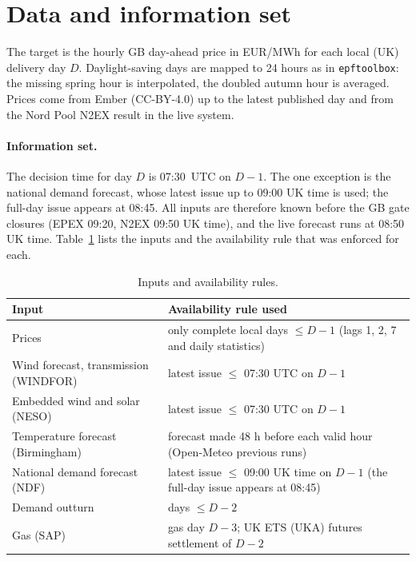 \documentclass[11pt,a4paper]{article}
\begin{document}
\section{Data and information set}
\label{sec:data}

The target is the hourly GB day-ahead price in EUR/MWh for each local (UK) delivery day $D$. Daylight-saving days are mapped to 24 hours as in \texttt{epftoolbox}: the missing spring hour is interpolated, the doubled autumn hour is averaged. Prices come from Ember (CC-BY-4.0) up to the latest published day and from the Nord Pool N2EX result in the live system.

\paragraph{Information set.} The decision time for day $D$ is 07:30~UTC on $D\!-\!1$. The one exception is the national demand forecast, whose latest issue up to 09:00 UK time is used; the full-day issue appears at 08:45. All inputs are therefore known before the GB gate closures (EPEX 09:20, N2EX 09:50 UK time), and the live forecast runs at 08:50 UK time. Table~\ref{tab:inputs} lists the inputs and the availability rule that was enforced for each.

\begin{table}[ht]
\centering\small
\begin{tabular}{p{4.6cm}p{9.6cm}}
\toprule
Input & Availability rule used\\
\midrule
Prices & only complete local days $\le D\!-\!1$ (lags 1, 2, 7 and daily statistics)\\
Wind forecast, transmission (WINDFOR) & latest issue $\le$ 07:30 UTC on $D\!-\!1$\\
Embedded wind and solar (NESO) & latest issue $\le$ 07:30 UTC on $D\!-\!1$\\
Temperature forecast (Birmingham) & forecast made 48 h before each valid hour (Open-Meteo previous runs)\\
National demand forecast (NDF) & latest issue $\le$ 09:00 UK time on $D\!-\!1$ (the full-day issue appears at 08:45)\\
Demand outturn & days $\le D\!-\!2$\\
Gas (SAP) & gas day $D\!-\!3$; UK ETS (UKA) futures settlement of $D\!-\!2$\\
\bottomrule
\end{tabular}
\caption{Inputs and availability rules.}
\label{tab:inputs}
\end{table}
\end{document}
